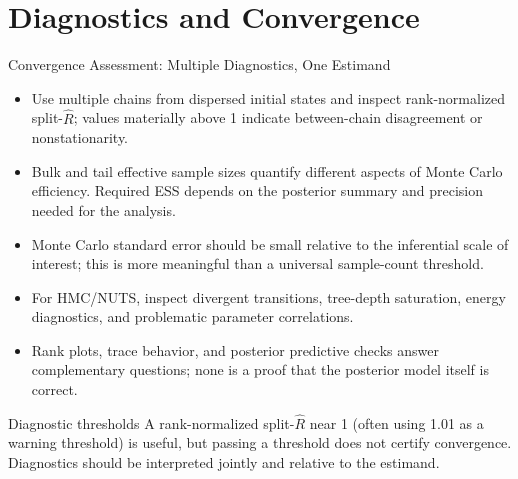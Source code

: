 \documentclass[aspectratio=169,11pt]{beamer}
\begin{document}
\section{Diagnostics and Convergence}

\begin{frame}{Convergence Assessment: Multiple Diagnostics, One Estimand}
  \begin{itemize}
    \item Use multiple chains from dispersed initial states and inspect rank-normalized split-$\hat R$; values materially above 1 indicate between-chain disagreement or nonstationarity.
    \item Bulk and tail effective sample sizes quantify different aspects of Monte Carlo efficiency. Required ESS depends on the posterior summary and precision needed for the analysis.
    \item Monte Carlo standard error should be small relative to the inferential scale of interest; this is more meaningful than a universal sample-count threshold.
    \item For HMC/NUTS, inspect divergent transitions, tree-depth saturation, energy diagnostics, and problematic parameter correlations.
    \item Rank plots, trace behavior, and posterior predictive checks answer complementary questions; none is a proof that the posterior model itself is correct.
  \end{itemize}

  \begin{alertblock}{Diagnostic thresholds}
    A rank-normalized split-$\hat R$ near 1 (often using 1.01 as a warning threshold) is useful, but passing a threshold does not certify convergence. Diagnostics should be interpreted jointly and relative to the estimand.
  \end{alertblock}
\end{frame}
\end{document}
